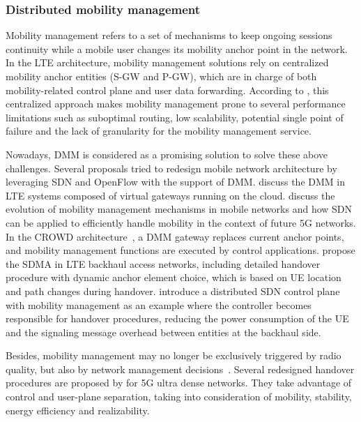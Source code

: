 \subsubsection{Distributed mobility management}
\label{subsec:handover}

Mobility management refers to a set of mechanisms to keep ongoing sessions
continuity while a mobile user changes its mobility anchor point in the
network. In the \ac{LTE} architecture, mobility management solutions rely on
centralized mobility anchor entities (\ac{S-GW} and \ac{P-GW}), which are in
charge of both mobility-related control plane and user data forwarding.
According to \citet{Valtulina2014}, this centralized approach makes mobility
management prone to several performance limitations such as suboptimal
routing, low scalability, potential single point of failure and the lack of
granularity for the mobility management service.

Nowadays, \acf{DMM} is considered as a promising solution to solve these above
challenges. Several proposals tried to redesign mobile network architecture by
leveraging \ac{SDN} and OpenFlow with the support of \ac{DMM}.
\citet{Karimzadeh2014} discuss the \ac{DMM} in \ac{LTE} systems composed of
virtual gateways running on the cloud. \citet{Kuklinski2014b} discuss the
evolution of mobility management mechanisms in mobile networks and how \ac{SDN}
can be applied to efficiently handle mobility in the context of future 5G
networks. In the CROWD architecture~\cite{Ahmad2013a}, a \ac{DMM} gateway
replaces current anchor points, and mobility management functions are executed
by control applications. \citet{Gurusanthosh2013} propose the \acf{SDMA} in
\ac{LTE} backhaul access networks, including detailed handover procedure with
dynamic anchor element choice, which is based on \ac{UE} location and path
changes during handover. \citet{Mahmoodi2014} introduce a distributed \ac{SDN}
control plane with mobility management as an example where the controller
becomes responsible for handover procedures, reducing the power consumption of
the \ac{UE} and the signaling message overhead between entities at the backhaul
side.

Besides, mobility management may no longer be exclusively triggered by radio
quality, but also by network management decisions~\cite{Rost2014}. Several
redesigned handover procedures are proposed by \citet{Zhang2015b} for 5G ultra
dense networks. They take advantage of control and user-plane separation,
taking into consideration of mobility, stability, energy efficiency and
realizability.

